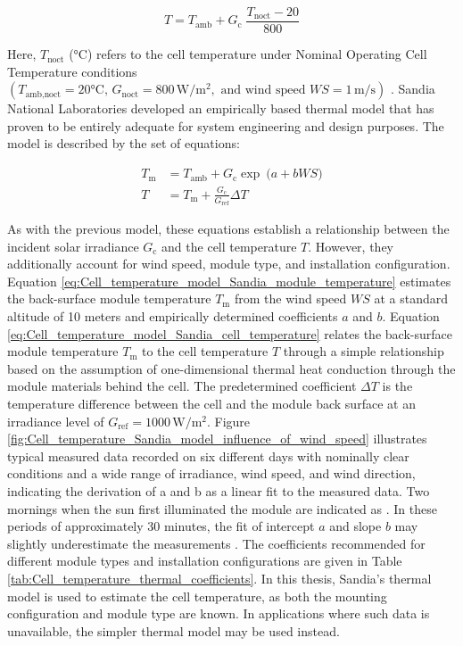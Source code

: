\begin{equation}
    T = T_{\text{amb}} + G_{\text{c}} \; \frac{T_{\text{noct}} - 20}{800}
\end{equation}

\noindent
Here, \(T_{\text{noct}}\) (\si{\degreeCelsius}) refers to the cell temperature under Nominal Operating
Cell Temperature conditions \((T_{\text{amb,noct}} = 20 \si{\degreeCelsius}, \,
G_{\text{noct}} = 800 \, \si{\watt\per\meter\squared}, \text{ and wind speed } WS = 1 \,
\si{\meter\per\second})\) \cite[p. 302]{Hegedus2003}.
Sandia National Laboratories developed an empirically based
thermal model that has proven to be entirely adequate for
system engineering and design purposes. The model is described
by the set of equations:

\begin{align}
    T_{\text{m}} &= T_{\text{amb}} + G_{\text{c}} \exp \: \bigl(a + b \mathit{WS} \bigr)
    \label{eq:Cell_temperature_model_Sandia_module_temperature} \\
    T &= T_{\text{m}} + \frac{G_{\text{c}}}{G_{\text{ref}}} \Delta T
    \label{eq:Cell_temperature_model_Sandia_cell_temperature}
\end{align}

\noindent
As with the previous model, these equations establish a relationship between
the incident solar irradiance \(G_{\text{c}}\) and the cell temperature \(T\). However,
they additionally account for wind speed, module type, and installation
configuration. Equation \ref{eq:Cell_temperature_model_Sandia_module_temperature}
estimates the back-surface module temperature \(T_{\text{m}}\) from the wind speed \(WS\)
at a standard altitude of 10 meters and empirically determined coefficients \(a\) and \(b\).
Equation \ref{eq:Cell_temperature_model_Sandia_cell_temperature} relates the
back-surface module temperature \(T_{\text{m}}\) to the cell temperature \(T\) through a
simple relationship based on the assumption of one-dimensional thermal heat
conduction through the module materials behind the cell. The predetermined
coefficient \(\Delta T\) is the temperature difference between the cell and the
module back surface at an irradiance level of \(G_{\text{ref}} = 1000 \, \si{\watt\per\meter\squared}\).
Figure \ref{fig:Cell_temperature_Sandia_model_influence_of_wind_speed} illustrates
typical measured data recorded on six different days with nominally clear
conditions and a wide range of irradiance, wind speed, and wind direction,
indicating the derivation of a and b as a linear fit to the measured data.
Two mornings when the sun first illuminated the module are indicated as .
In these periods of approximately 30 minutes, the fit of intercept \(a\) and slope \(b\)
may slightly underestimate the measurements \cite[p. 17ff]{Kratochvil2004}.
The coefficients recommended for different module types and installation
configurations are given in Table \ref{tab:Cell_temperature_thermal_coefficients}.
In this thesis, Sandia's thermal model is used to estimate the cell temperature,
as both the mounting configuration and module type are known. In applications
where such data is unavailable, the simpler thermal model may be used instead.

